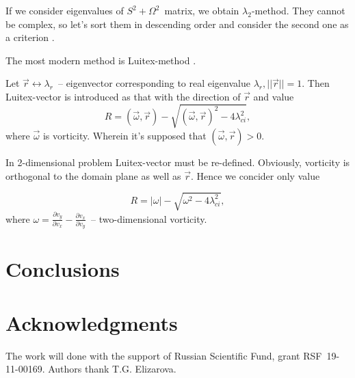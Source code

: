 \documentclass{article}
\begin{document}
If we consider eigenvalues of $S^2+\Omega^2$~matrix, we obtain $\lambda_2$-method. They cannot be complex, so let's sort them in descending order and consider the second one as a criterion \cite{vortex,Hussain}.

The most modern method is Luitex-method \cite{vortex}.

Let $\vec r \longleftrightarrow \lambda_r$~-- eigenvector corresponding to real eigenvalue $\lambda_r, ||\vec r||=1$. Then Luitex-vector is introduced as that with the direction of $\vec r$ and value
 $$R=(\vec \omega,\vec r)-\sqrt{(\vec \omega,\vec r)^2-4\lambda_{ci}^2},$$\noindent where $\vec \omega$ is vorticity. Wherein it's supposed that $(\vec \omega,\vec r)>0$.
 
 In 2-dimensional problem Luitex-vector must be re-defined. Obviously, vorticity is orthogonal to the domain plane as well as $\vec r$. Hence we concider only value
 
 $$R=|\omega|- \sqrt{\omega^2-4\lambda_{ci}^2},$$\noindent where $\omega=\frac{\partial v_y}{\partial v_x}-\frac{\partial v_x}{\partial v_y}$~-- two-dimensional vorticity.

\section{Conclusions}



\section{Acknowledgments}



The work will done with the support of Russian Scientific Fund, grant RSF~19-11-00169.
Authors thank T.G. Elizarova.



\end{document}
